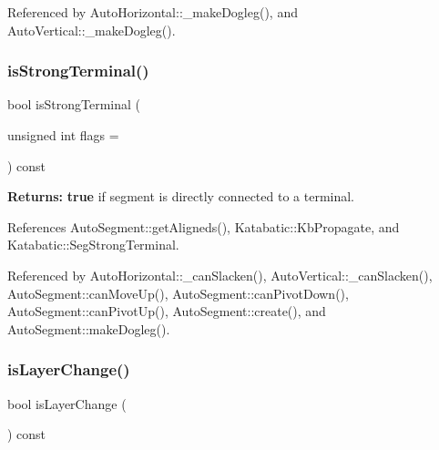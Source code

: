 Referenced by Auto\+Horizontal\+::\+\_\+make\+Dogleg(), and Auto\+Vertical\+::\+\_\+make\+Dogleg().

\mbox{\label{classKatabatic_1_1AutoSegment_a4605c9284168f0a62fa48aa2d3ae5ee9}} 
\subsubsection{\texorpdfstring{is\+Strong\+Terminal()}{isStrongTerminal()}}
{\footnotesize\ttfamily bool is\+Strong\+Terminal (\begin{DoxyParamCaption}\item[{unsigned int}]{flags = {} }\end{DoxyParamCaption}) const}

{\bfseries Returns\+:} {\bfseries true} if segment is directly connected to a terminal. 

References Auto\+Segment\+::get\+Aligneds(), Katabatic\+::\+Kb\+Propagate, and Katabatic\+::\+Seg\+Strong\+Terminal.



Referenced by Auto\+Horizontal\+::\+\_\+can\+Slacken(), Auto\+Vertical\+::\+\_\+can\+Slacken(), Auto\+Segment\+::can\+Move\+Up(), Auto\+Segment\+::can\+Pivot\+Down(), Auto\+Segment\+::can\+Pivot\+Up(), Auto\+Segment\+::create(), and Auto\+Segment\+::make\+Dogleg().

\mbox{\label{classKatabatic_1_1AutoSegment_a772596f5d5fa897822dbd0da37024735}} 
\subsubsection{\texorpdfstring{is\+Layer\+Change()}{isLayerChange()}}
{\footnotesize\ttfamily bool is\+Layer\+Change (\begin{DoxyParamCaption}{ }\end{DoxyParamCaption}) const\hspace{0.3cm}{\ttfamily [inline]}}

